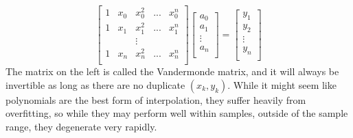 \documentclass{article}
\begin{document}
\[
    \left[
        \begin{array}{ccccc}
            1 & x_0 & x_0^2 & ... & x_0^n\\
            1 & x_1 & x_1^2 & ... & x_1^n\\
            & & \vdots & &\\
            1 & x_n & x_n^2 & ... & x_n^n\\
        \end{array}
    \right]\left[
        \begin{array}{c}
            a_0\\
            a_1\\
            \vdots\\
            a_n\\
        \end{array}
    \right]=\left[
        \begin{array}{c}
            y_1\\
            y_2\\
            \vdots\\
            y_n\\
        \end{array}
    \right]
\]
The matrix on the left is called the Vandermonde matrix,
and it will always be invertible as long as there are no duplicate $(x_k, y_k)$.
While it might seem like polynomials are the best form of interpolation, they suffer heavily from
overfitting, so while they may perform well within samples, outside of the sample range, they degenerate very rapidly.
\end{document}
